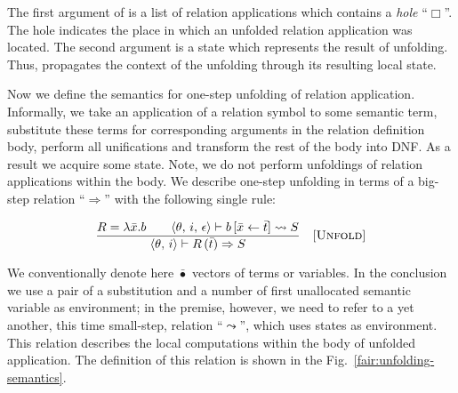 The first argument of  is a list of relation applications which contains a \emph{hole} ``$\Box$''. The hole indicates the place in which
an unfolded relation application was located. The second argument is a state which represents the result of unfolding. Thus,  propagates the
context of the unfolding through its resulting local state.

Now we define the semantics for one-step unfolding of relation application. Informally, we take an application of a relation symbol to some semantic term, substitute these
terms for corresponding arguments in the relation definition body, perform all unifications and transform the rest of the body into DNF. As a result we acquire some state. Note, we
do not perform unfoldings of relation applications within the body. We describe one-step unfolding in terms of a big-step relation ``$\Rightarrow$'' with the following
single rule:

\[
\begin{array}{cr}
  \dfrac{R = \lambda \bar{x}. b \qquad \langle \theta,\, i,\, \epsilon \rangle \vdash b\,[\bar{x} \leftarrow \bar{t}] \leadsto S}
      {\langle \theta,\,i \rangle \vdash R\,(\bar{t}) \Rightarrow S}
      &     \mbox{[\textsc{Unfold}]}
\end{array}
\]

We conventionally denote here $\bar{\bullet}$ vectors of terms or variables. In the conclusion we use a pair of a substitution and a number of first unallocated semantic variable as
environment; in the premise, however, we need to refer to a yet another, this time small-step, relation ``$\leadsto$'', which uses states as environment. This relation describes the
local computations within the body of unfolded application.  The definition of this relation is shown in the Fig.~\ref{fair:unfolding-semantics}.

